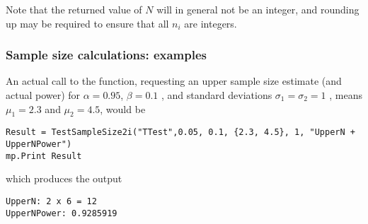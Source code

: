  Note that the returned value of $N$ will in general not be an integer, and rounding up may be required to ensure that all $n_i$ are integers.


%
%




\subsubsection{Sample size calculations: examples}
An actual call to the function, requesting an upper sample size estimate (and actual power) for $\alpha = 0.95$, $\beta=0.1$ , and standard deviations $\sigma_1=\sigma_2=1$ , means $\mu_1=2.3$ and $\mu_2=4.5$,   would be

\begin{lstlisting}
Result = TestSampleSize2i("TTest",0.05, 0.1, {2.3, 4.5}, 1, "UpperN + UpperNPower")
mp.Print Result
\end{lstlisting}
which produces the output

\begin{verbatim}
UpperN: 2 x 6 = 12
UpperNPower: 0.9285919
\end{verbatim}



